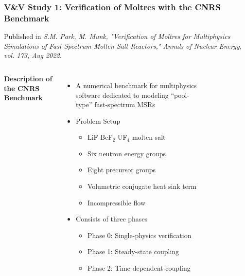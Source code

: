 \begin{frame}
  \frametitle{V\&V Study 1: Verification of Moltres with the CNRS Benchmark}

  Published in \textit{S.M. Park, M. Munk, "Verification of Moltres for Multiphysics Simulations of
    Fast-Spectrum Molten Salt Reactors," Annals of Nuclear Energy, vol. 173, Aug 2022.}
  \vspace{.2cm}

  \begin{columns}
    \column[t]{6.5cm}
    \textbf{Description of the CNRS Benchmark \cite{tiberga_results_2020}}
    \vspace{.2cm}

      \begin{itemize}
        \item A numerical benchmark for multiphysics software dedicated to modeling ``pool-type''
          fast-spectrum MSRs
        \item Problem Setup
          \begin{itemize}
            \item LiF-BeF$_2$-UF$_4$ molten salt
            \item Six neutron energy groups
            \item Eight precursor groups
            \item Volumetric conjugate heat sink term
            \item Incompressible flow
          \end{itemize}
        \item Consists of three phases
          \begin{itemize}
            \item Phase 0: Single-physics verification
            \item Phase 1: Steady-state coupling
            \item Phase 2: Time-dependent coupling
          \end{itemize}
      \end{itemize}
    \column[t]{3.5cm}
    \begin{figure}
      \centering

\end{figure}
\end{columns}
\end{frame}
